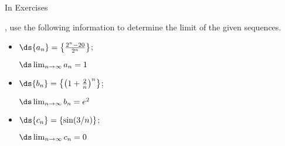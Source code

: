 {\noindent In Exercises}
{, use the following information to determine the limit of the given sequences.

\begin{itemize}
\item		\parbox{90pt}{$\ds \{a_n\} = \left\{\frac{2^n-20}{2^n}\right\}$;}\quad $\ds \lim_{n\to\infty} a_n = 1$
\item		\parbox{90pt}{$\ds \{b_n\} = \left\{\left(1+\frac{2}{n}\right)^n\right\}$;}\quad $\ds \lim_{n\to\infty} b_n = e^2$
\item		\parbox{90pt}{$\ds \{c_n\} = \left\{\sin (3/n)\right\}$;}\quad $\ds \lim_{n\to\infty} c_n = 0$
\end{itemize}}
